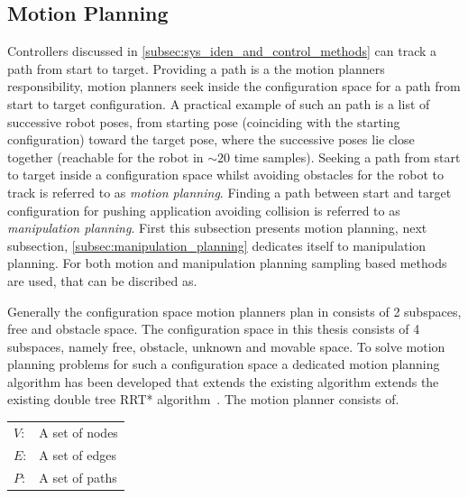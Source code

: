 \subsection{Motion Planning}%
\label{subsec:motion_planning}

Controllers discussed in \cref{subsec:sys_iden_and_control_methods} can track a path from start to target. Providing a path is a the motion planners responsibility, motion planners seek inside the configuration space for a path from start to target configuration. A practical example of such an path is a list of successive robot poses, from starting pose (coinciding with the starting configuration) toward the target pose, where the successive poses lie close together (reachable for the robot in $\sim20$ time samples). Seeking a path from start to target inside a configuration space whilst avoiding obstacles for the robot to track is referred to as \textit{motion planning}. Finding a path between start and target configuration for pushing application avoiding collision is referred to as \textit{manipulation planning}. First this subsection presents motion planning, next subsection, \cref{subsec:manipulation_planning} dedicates itself to manipulation planning. For both motion and manipulation planning sampling based methods are used, that can be discribed as.\bs

\textit{}\bs

Generally the configuration space motion planners plan in consists of 2 subspaces, free and obstacle space. The configuration space in this thesis consists of 4 subspaces, namely free, obstacle, unknown and movable space. To solve motion planning problems for such a configuration space a dedicated motion planning algorithm has been developed that extends the existing algorithm extends the existing double tree \ac{RRT*} algorithm~\cite{chen_fast_2018}. The motion planner consists of.
\begin{center}
\begin{tabular}[t]{l p{10cm}}
$V$:& A set of nodes\\
$E$:& A set of edges\\
$P$:& A set of paths\\
\end{tabular}
\end{center}

